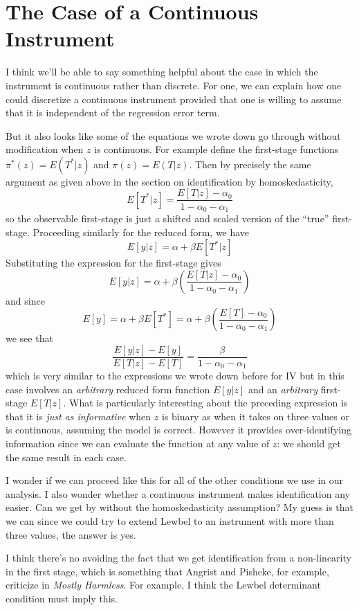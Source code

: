 \section{The Case of a Continuous Instrument} 
I think we'll be able to say something helpful about the case in which the instrument is continuous rather than discrete.
For one, we can explain how one could discretize a continuous instrument provided that one is willing to assume that it is independent of the regression error term.

But it also looks like some of the equations we wrote down go through without modification when $z$ is continuous.
For example define the first-stage functions $\pi^*(z) = E(T^*|z)$ and $\pi(z) = E(T|z)$.
Then by precisely the same argument as given above in the section on identification by homoskedasticity,
\begin{equation}
  E[T^*|z] = \frac{E[T|z] - \alpha_0}{1 - \alpha_0 - \alpha_1}
\end{equation}
so the observable first-stage is just a shifted and scaled version of the ``true'' first-stage.
Proceeding similarly for the reduced form, we have 
\begin{equation}
  E[y|z] =  \alpha + \beta E[T^*|z]
\end{equation}
Substituting the expression for the first-stage gives
\begin{equation}
  E[y|z] = \alpha + \beta \left( \frac{E[T|z]- \alpha_0}{1 - \alpha_0 - \alpha_1} \right) 
\end{equation}
and since 
\begin{equation}
  E[y] = \alpha + \beta E[T^*] = \alpha + \beta \left( \frac{E[T] - \alpha_0}{1 - \alpha_0 - \alpha_1} \right)
\end{equation}
we see that
\begin{equation}
  \frac{E[y|z] - E[y]}{E[T|z] - E[T]} = \frac{\beta}{1 - \alpha_0 - \alpha_1}
\end{equation}
which is very similar to the expressions we wrote down before for IV but in this case involves an \emph{arbitrary} reduced form function $E[y|z]$ and an \emph{arbitrary} first-stage $E[T|z]$.
What is particularly interesting about the preceding expression is that it is \emph{just as informative} when $z$ is binary as when it takes on three values or is continuous, assuming the model is correct.
However it provides over-identifying information since we can evaluate the function at any value of $z$: we should get the same result in each case.

I wonder if we can proceed like this for all of the other conditions we use in our analysis. 
I also wonder whether a continuous instrument makes identification any easier.
Can we get by without the homoskedasticity assumption?
My guess is that we can since we could try to extend Lewbel to an instrument with more than three values, the answer is yes.

I think there's no avoiding the fact that we get identification from a non-linearity in the first stage, which is something that Angrist and Pishcke, for example, criticize in \emph{Mostly Harmless}.
For example, I think the Lewbel determinant condition must imply this.

